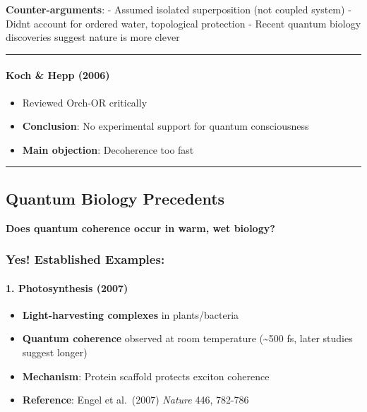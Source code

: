 \textbf{Counter-arguments}: - Assumed isolated superposition (not
coupled system) - Didn\textquotesingle t account for ordered water,
topological protection - Recent quantum biology discoveries suggest
nature is more clever

\begin{center}\rule{0.5\linewidth}{0.5pt}\end{center}

\paragraph{Koch \& Hepp (2006)}\label{koch-hepp-2006}

\begin{itemize}
\tightlist
\item
  Reviewed Orch-OR critically
\item
  \textbf{Conclusion}: No experimental support for quantum consciousness
\item
  \textbf{Main objection}: Decoherence too fast
\end{itemize}

\begin{center}\rule{0.5\linewidth}{0.5pt}\end{center}

\subsection{Quantum Biology
Precedents}\label{quantum-biology-precedents}

\textbf{Does quantum coherence occur in warm, wet biology?}

\subsubsection{Yes! Established
Examples:}\label{yes-established-examples}

\paragraph{1. Photosynthesis (2007)}\label{photosynthesis-2007}

\begin{itemize}
\tightlist
\item
  \textbf{Light-harvesting complexes} in plants/bacteria
\item
  \textbf{Quantum coherence} observed at room temperature
  (\textasciitilde500 fs, later studies suggest longer)
\item
  \textbf{Mechanism}: Protein scaffold protects exciton coherence
\item
  \textbf{Reference}: Engel et al.~(2007) \emph{Nature} 446, 782-786
\end{itemize}

